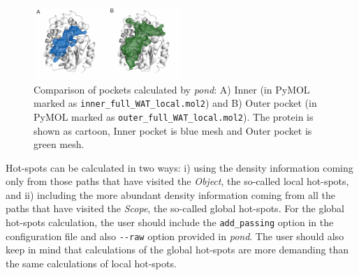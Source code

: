 \documentclass[9pt,tutorial]{livecoms}
\begin{document}
\begin{figure}[ht!]
\centering
\includegraphics[width=0.5\textwidth]{Tut4.2.png}
\caption{Comparison of pockets calculated by \textit{pond}: A) Inner (in PyMOL marked as \texttt{inner\_full\_WAT\_local.mol2}) and B) Outer pocket (in PyMOL marked as \texttt{outer\_full\_WAT\_local.mol2}). The protein is shown as cartoon, Inner pocket is blue mesh and Outer pocket is green mesh.}
\label{Tut4.2}
\end{figure}

Hot-spots can be calculated in two ways: i) using the density information coming only from those paths that have visited the \emph{Object}, the so-called local hot-spots, and ii) including the more abundant density information coming from all the paths that have visited the \emph{Scope}, the so-called global hot-spots. For the global hot-spots calculation, the user should include the \texttt{add\_passing} option in the configuration file and also \texttt{-{}-raw} option provided in \emph{pond}. The user should also keep in mind that calculations of the global hot-spots are more demanding than the same calculations of local hot-spots.
\end{document}
